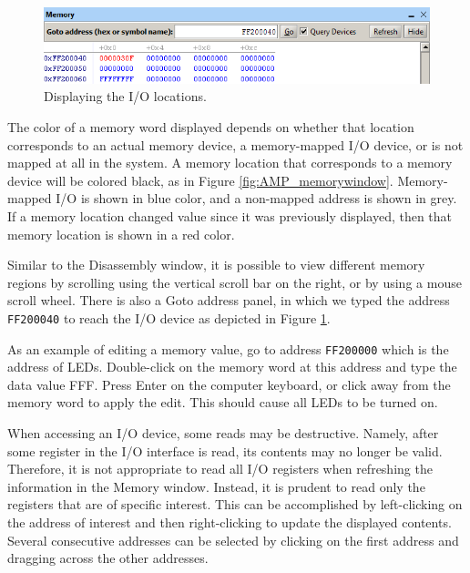 \documentclass[11pt, twoside, pdftex]{article}
\begin{document}
\begin{figure}[H]
   \begin{center}
      \includegraphics[scale=1]{screenshots/figure37.png}
   \end{center}
   \caption{Displaying the I/O locations.} 
   \label{fig:AMP_memoryIO}
\end{figure}

The color of a memory word displayed depends on whether that
location corresponds to an actual memory device, a memory-mapped
I/O device, or is not mapped at all in the system. 
A memory location that corresponds to a memory device will be 
colored black, as in Figure \ref{fig:AMP_memorywindow}. Memory-mapped I/O is shown in
blue color, and a non-mapped address is shown in grey. 
If a memory location changed value since it was previously
displayed, then that memory location is shown in a red color.

Similar to the Disassembly window, it is possible to view
different memory regions by scrolling using the vertical scroll
bar on the right, or by using a mouse scroll wheel.
There is also a \textsf{Goto address} panel, in which we typed
the address \texttt{FF200040} to reach the I/O device as
depicted in Figure \ref{fig:AMP_memoryIO}.
  
As an example of editing a memory value, go to address
\texttt{FF200000} which is the address of LEDs.
Double-click on the memory word at this address 
and type the data value FFF. Press \textsf{Enter} on
the computer keyboard, or click away from the memory word to
apply the edit. This should cause all LEDs to be turned on. 

When accessing an I/O device, some reads may be destructive.
Namely, after some register in the I/O interface is read, its
contents may no longer be valid. Therefore, it is not
appropriate to read all I/O registers when refreshing the
information in the Memory window. Instead, it is prudent to read
only the registers that are of specific interest. This can be
accomplished  by left-clicking on the address of interest and
then right-clicking to update the displayed contents. Several
consecutive addresses can be selected by clicking on the first
address and dragging across the other addresses.
\end{document}
